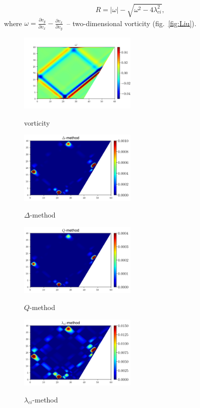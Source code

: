 \documentclass[a4wide,fontsize=12pt]{article}
\begin{document}
 $$R=|\omega|- \sqrt{\omega^2-4\lambda_{ci}^2},$$\noindent where $\omega=\frac{\partial v_y}{\partial v_x}-\frac{\partial v_x}{\partial v_y}$~-- two-dimensional vorticity (fig.~\ref{fig:Liu}).

\begin{figure}
\begin{multicols}{2}
    \centering
    \includegraphics[width=0.5\textwidth]{Figs/VortexRot.png}
    \caption{vorticity}
    \label{fig:vorticity}
    \hfill
    \includegraphics[width=0.5\textwidth]{Figs/VortexDelta.png}
    \caption{$\Delta$-method}
    \label{fig:Delta}
\end{multicols}
\end{figure}

\begin{figure}
\begin{multicols}{2}
    \centering
    \includegraphics[width=0.5\textwidth]{Figs/VortexQ.png}
    \caption{$Q$-method}
    \label{fig:Q}
    \hfill
    \includegraphics[width=0.5\textwidth]{Figs/VortexLambdaCi.png}
    \caption{$\lambda_{ci}$-method}
    \label{fig:Lci}
    \end{multicols}
\end{figure}
\end{document}
